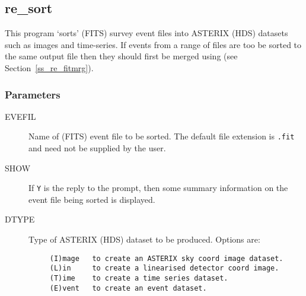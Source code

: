 \subsection{\label{ss_re_sort}re\_sort}	

This program `sorts' (FITS) survey event files into ASTERIX (HDS)
datasets such as images and time-series.  If events from a range of
files are too be sorted to the same output file then they should first
be merged using  (see
Section~\ref{ss_re_fitmrg}).

\subsubsection{Parameters}

\begin{description}
\item[EVEFIL   ]
Name of (FITS) event file to be sorted.  The default file extension is 
{\tt .fit} and need not be supplied by the user.
\item[SHOW   ]
If {\tt Y} is the reply to the prompt, then some summary information on the
event file being sorted is displayed.
\item[DTYPE   ]
 Type of ASTERIX (HDS) dataset to be produced.  Options are:

\begin{verbatim}
     (I)mage   to create an ASTERIX sky coord image dataset.
     (L)in     to create a linearised detector coord image.
     (T)ime    to create a time series dataset.
     (E)vent   to create an event dataset.
\end{verbatim}


\end{description}
